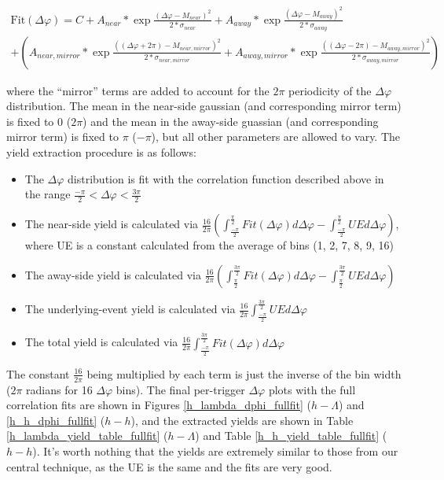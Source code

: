 \documentclass[ALICE,manyauthors]{ALICE_analysis_notes}
\begin{document}
\begin{gather*}
	\text{Fit}(\Delta\varphi) = C + A_{near}*\exp{\frac{(\Delta\varphi - M_{near})^2}{2*\sigma_{near}}} + A_{away}*\exp{\frac{(\Delta\varphi - M_{away})^2}{2*\sigma_{away}}} \\
	+ (A_{near,mirror}*\exp{\frac{((\Delta\varphi+2\pi) - M_{near,mirror})^2}{2*\sigma_{near,mirror}}} + A_{away,mirror}*\exp{\frac{((\Delta\varphi-2\pi) - M_{away,mirror})^2}{2*\sigma_{away,mirror}}})
\end{gather*}

where the ``mirror'' terms are added to account for the $2\pi$ periodicity of the $\Delta\varphi$ distribution. The mean in the near-side gaussian (and corresponding mirror term) is fixed to 0 ($2\pi$) and the mean in the away-side guassian (and corresponding mirror term) is fixed to $\pi$ ($-\pi$), but all other parameters are allowed to vary. The yield extraction procedure is as follows:

\begin{itemize}
\item The $\Delta\varphi$ distribution is fit with the correlation function described above in the range $\frac{-\pi}{2} < \Delta\varphi < \frac{3\pi}{2}$
\item The near-side yield is calculated via $\frac{16}{2\pi}(\int_{\frac{-\pi}{2}}^{\frac{\pi}{2}}Fit(\Delta\varphi)d\Delta\varphi - \int_{\frac{-\pi}{2}}^{\frac{\pi}{2}}UE d\Delta\varphi)$, where UE is a constant calculated from the average of bins (1, 2, 7, 8, 9, 16)
\item The away-side yield is calculated via $\frac{16}{2\pi}(\int_{\frac{\pi}{2}}^{\frac{3\pi}{2}}Fit(\Delta\varphi)d\Delta\varphi - \int_{\frac{\pi}{2}}^{\frac{3\pi}{2}}UE d\Delta\varphi)$
\item The underlying-event yield is calculated via $\frac{16}{2\pi}\int_{\frac{-\pi}{2}}^{\frac{3\pi}{2}}UE d\Delta\varphi$
\item The total yield is calculated via $\frac{16}{2\pi}\int_{\frac{-\pi}{2}}^{\frac{3\pi}{2}}Fit(\Delta\varphi) d\Delta\varphi$
\end{itemize}

The constant $\frac{16}{2\pi}$ being multiplied by each term is just the inverse of the bin width ($2\pi$ radians for 16 $\Delta\varphi$ bins).
The final per-trigger $\Delta\varphi$ plots with the full correlation fits are shown in Figures \ref{h_lambda_dphi_fullfit} ($h-\Lambda$) and \ref{h_h_dphi_fullfit} ($h-h$), and the extracted yields are shown in Table \ref{h_lambda_yield_table_fullfit} ($h-\Lambda$) and Table \ref{h_h_yield_table_fullfit} ($h-h$). It's worth nothing that the yields are extremely similar to those from our central technique, as the UE is the same and the fits are very good.
\end{document}
